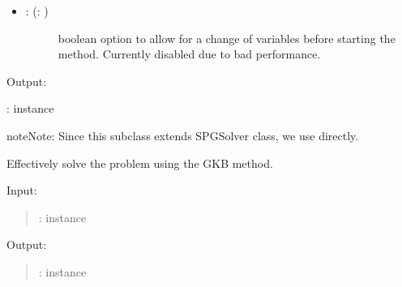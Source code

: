 \documentclass[a4paper,10pt,english]{sphinxmanual}
\begin{document}
\begin{fulllineitems}
\begin{description}
\begin{itemize}
\item {} \begin{description}
\item[{: (: )}] \leavevmode
boolean option to allow for a change of variables before starting the 
method. Currently disabled due to bad performance.

\end{description}

\end{itemize}

\end{description}

Output:

:  instance

\begin{sphinxadmonition}{note}{Note:}
Since this subclass extends SPGSolver class, we use 
 directly.
\end{sphinxadmonition}

\begin{fulllineitems}
\label{\detokenize{skprocrustes:skprocrustes.GKBSolver.solve}}
Effectively solve the problem using the GKB method.

Input:
\begin{quote}

:  instance
\end{quote}

Output:
\begin{quote}

:  instance
\end{quote}

\end{fulllineitems}


\end{fulllineitems}

\end{document}
